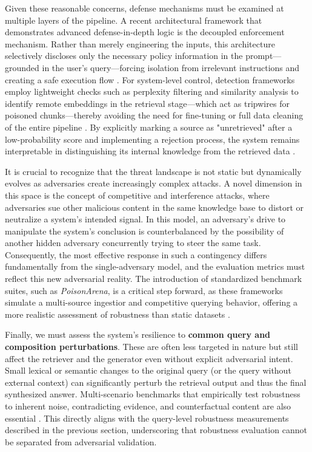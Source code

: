 \documentclass[11pt,a4paper]{article}
\begin{document}
Given these reasonable concerns, defense mechanisms must be examined at multiple layers of the pipeline. A recent architectural framework that demonstrates advanced defense-in-depth logic is the decoupled enforcement mechanism. Rather than merely engineering the inputs, this architecture selectively discloses only the necessary policy information in the prompt---grounded in the user's query---forcing isolation from irrelevant instructions and creating a safe execution flow \cite{arxiv:2502.06872v1}. For system-level control, detection frameworks employ lightweight checks such as perplexity filtering and similarity analysis to identify remote embeddings in the retrieval stage---which act as tripwires for poisoned chunks---thereby avoiding the need for fine-tuning or full data cleaning of the entire pipeline \cite{arxiv:2502.06872v1}. By explicitly marking a source as "unretrieved" after a low-probability score and implementing a rejection process, the system remains interpretable in distinguishing its internal knowledge from the retrieved data \cite{arxiv:2502.06872v1}.

It is crucial to recognize that the threat landscape is not static but dynamically evolves as adversaries create increasingly complex attacks. A novel dimension in this space is the concept of competitive and interference attacks, where adversaries sue other malicious content in the same knowledge base to distort or neutralize a system's intended signal. In this model, an adversary's drive to manipulate the system's conclusion is counterbalanced by the possibility of another hidden adversary concurrently trying to steer the same task. Consequently, the most effective response in such a contingency differs fundamentally from the single-adversary model, and the evaluation metrics must reflect this new adversarial reality. The introduction of standardized benchmark suites, such as \emph{PoisonArena}, is a critical step forward, as these frameworks simulate a multi-source ingestior and competitive querying behavior, offering a more realistic assessment of robustness than static datasets \cite{arxiv:2502.06872v1}.

Finally, we must assess the system's resilience to \textbf{common query and composition perturbations}. These are often less targeted in nature but still affect the retriever and the generator even without explicit adversarial intent. Small lexical or semantic changes to the original query (or the query without external context) can significantly perturb the retrieval output and thus the final synthesized answer. Multi-scenario benchmarks that empirically test robustness to inherent noise, contradicting evidence, and counterfactual content are also essential \cite{arxiv:2502.06872v1,arxiv:2506.00054v1}. This directly aligns with the query-level robustness measurements described in the previous section, underscoring that robustness evaluation cannot be separated from adversarial validation.
\end{document}
